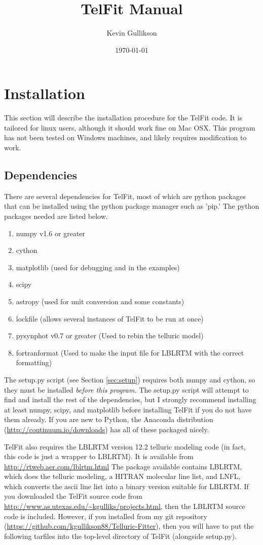 \documentclass{article}
\begin{document}
\title{TelFit Manual}
\author{Kevin Gullikson}
\date{\today}
\maketitle



\section{Installation}
\label{sec:installation}
This section will describe the installation procedure for the TelFit code. It is tailored for linux users, although it should work fine on Mac OSX. This program has not been tested on Windows machines, and likely requires modification to work.
\subsection{Dependencies}
There are several dependencies for TelFit, most of which are python packages that can be installed using the python package manager such as 'pip.' The python packages needed are listed below.
\begin{enumerate}
\item numpy v1.6 or greater
\item cython     
\item matplotlib (used for debugging and in the examples)
\item scipy
\item astropy    (used for unit conversion and some constants)
\item lockfile   (allows several instances of TelFit to be run at once)
\item pysynphot v0.7 or greater  (Used to rebin the telluric model)
\item fortranformat (Used to make the input file for LBLRTM with the correct formatting)
\end{enumerate}
The setup.py script (see Section \ref{sec:setup}) requires both numpy and cython, so they must be installed \emph{before this program.} The setup.py script will attempt to find and install the rest of the dependencies, but I strongly recommend installing at least numpy, scipy, and matplotlib before installing TelFit if you do not have them already. If you are new to Python, the Anaconda distribution (\url{http://continuum.io/downloads}) has all of these packaged nicely.

TelFit also requires the LBLRTM version 12.2 telluric modeling code (in fact, this code is just a wrapper to LBLRTM). It is available from \url{http://rtweb.aer.com/lblrtm.html} The package available contains LBLRTM, which does the telluric modeling, a HITRAN molecular line list, and LNFL, which converts the ascii line list into a binary version suitable for LBLRTM. If you downloaded the TelFit source code from \url{http://www.as.utexas.edu/~kgulliks/projects.html}, then the LBLRTM source code is included. However, if you installed from my git repository (\url{https://github.com/kgullikson88/Telluric-Fitter}), then you will have to put the following tarfiles into the top-level directory of TelFit (alongside setup.py).
\end{document}
